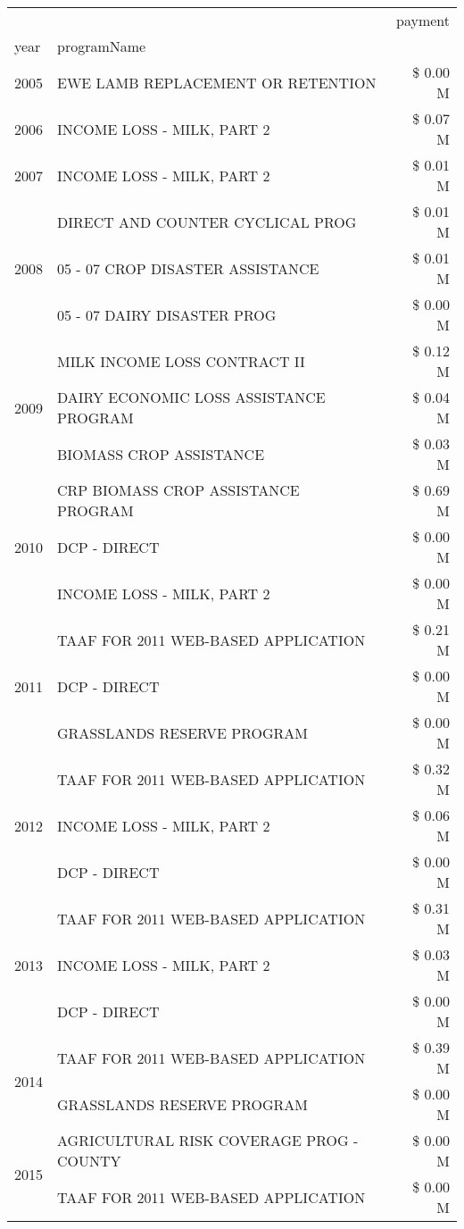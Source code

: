 \begin{tabular}{llr}
\toprule
 &  & payment \\
year & programName &  \\
\midrule
2005 & EWE LAMB REPLACEMENT OR RETENTION & \$ 0.00 M \\
\cline{1-3}
2006 & INCOME LOSS - MILK, PART 2 & \$ 0.07 M \\
\cline{1-3}
2007 & INCOME LOSS - MILK, PART 2 & \$ 0.01 M \\
\cline{1-3}
\multirow[t]{3}{*}{2008} & DIRECT AND COUNTER CYCLICAL PROG & \$ 0.01 M \\
 & 05 - 07 CROP DISASTER ASSISTANCE & \$ 0.01 M \\
 & 05 - 07 DAIRY DISASTER PROG & \$ 0.00 M \\
\cline{1-3}
\multirow[t]{3}{*}{2009} & MILK INCOME LOSS CONTRACT II & \$ 0.12 M \\
 & DAIRY ECONOMIC LOSS ASSISTANCE PROGRAM & \$ 0.04 M \\
 & BIOMASS CROP ASSISTANCE & \$ 0.03 M \\
\cline{1-3}
\multirow[t]{3}{*}{2010} & CRP BIOMASS CROP ASSISTANCE PROGRAM & \$ 0.69 M \\
 & DCP - DIRECT & \$ 0.00 M \\
 & INCOME LOSS - MILK, PART 2 & \$ 0.00 M \\
\cline{1-3}
\multirow[t]{3}{*}{2011} & TAAF FOR 2011 WEB-BASED APPLICATION & \$ 0.21 M \\
 & DCP - DIRECT & \$ 0.00 M \\
 & GRASSLANDS RESERVE PROGRAM & \$ 0.00 M \\
\cline{1-3}
\multirow[t]{3}{*}{2012} & TAAF FOR 2011 WEB-BASED APPLICATION & \$ 0.32 M \\
 & INCOME LOSS - MILK, PART 2 & \$ 0.06 M \\
 & DCP - DIRECT & \$ 0.00 M \\
\cline{1-3}
\multirow[t]{3}{*}{2013} & TAAF FOR 2011 WEB-BASED APPLICATION & \$ 0.31 M \\
 & INCOME LOSS - MILK, PART 2 & \$ 0.03 M \\
 & DCP - DIRECT & \$ 0.00 M \\
\cline{1-3}
\multirow[t]{2}{*}{2014} & TAAF FOR 2011 WEB-BASED APPLICATION & \$ 0.39 M \\
 & GRASSLANDS RESERVE PROGRAM & \$ 0.00 M \\
\cline{1-3}
\multirow[t]{3}{*}{2015} & AGRICULTURAL RISK COVERAGE PROG - COUNTY & \$ 0.00 M \\
 & TAAF FOR 2011 WEB-BASED APPLICATION & \$ 0.00 M \\

\end{tabular}
